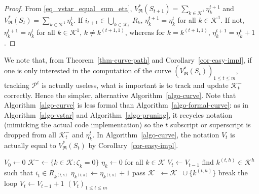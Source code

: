 \documentclass[
  11pt,
  a4paper,
]{article}
\theoremstyle{plain}
\theoremstyle{definition}
\theoremstyle{plain}
\theoremstyle{definition}
\theoremstyle{plain}
\theoremstyle{remark}
\begin{document}
\begin{proof}
From \eqref{eq_vstar_equal_sum_eta},
\(V^*_{\mathfrak{R}}(S_{t+1})=\sum_{k\in\mathcal{K}^1} \eta_k^{t+1}\)
and \(V^*_{\mathfrak{R}}(S_{t})=\sum_{k\in\mathcal{K}^1} \eta_k^{t}\).
If \(i_{t+1}\in \bigcup_{k\in\mathcal{K}^-_t}R_k\),
\(\eta_k^{t+1}=\eta_k^{t}\) for all \(k\in\mathcal{K}^1\). If not,
\(\eta_k^{t+1}=\eta_k^{t}\) for all \(k\in\mathcal{K}^1\),
\(k\neq k^{(t+1,1)}\), whereas for \(k= k^{(t+1,1)}\),
\(\eta_k^{t+1}=\eta_k^{t}+1\).
\end{proof}

We note that, from Theorem~\ref{thm-curve-path} and
Corollary~\ref{cor-easy-impl}, if one is only interested in the
computation of the curve
\(\left(V^*_{\mathfrak{R}}(S_{t})\right)_{1\leq t\leq m}\), tracking
\(\mathcal{P}^t\) is actually useless, what is important is to track and
update \(\mathcal{K}^-_t\) correctly. Hence the simpler, alternative
Algorithm~\ref{algo-curve}. Note that Algorithm~\ref{algo-curve} is less
formal than Algorithm~\ref{algo-formal-curve}: as in
Algorithm~\ref{algo-vstar} and Algorithm~\ref{algo-pruning}, it recycles
notation (mimicking the actual code implementation) so the \(t\)
subscript or superscript is dropped from all \(\mathcal{K}^-_t\) and
\(\eta_k^t\). In Algorithm~\ref{algo-curve}, the notation \(V_t\) is
actually equal to \(V^*_{\mathfrak{R}}(S_{t})\) by
Corollary~\ref{cor-easy-impl}.

\begin{algorithm}[htb!]
\caption{\label{algo-curve}Practical computation of $(V^*_{\mathfrak{R}}(S_t))_{0\leq t\leq m}$}
\begin{algorithmic}[1]
  \State $V_0\gets 0$
  \State $\mathcal{K}^-\gets\{k\in\mathcal{K} : \zeta_k=0  \}$
  \State $\eta_k\gets 0$ for all $k\in\mathcal{K}$
      \State $V_{t}\gets V_{t-1}$
    \Else
        \State find $k^{(t,h)}\in\mathcal{K}^{h}$ such that $i_t\in R_{k^{(t,h)}}$
        \State $\eta_{k^{(t,h)}}\gets\eta_{k^{(t,h)}} + 1$
          \State pass
        \Else
          \State $\mathcal{K}^- \gets \mathcal{K}^-\cup \{ k^{(t,h)} \}$
          \State break the loop
        \EndIf
      \EndFor
     \State $V_{t}\gets V_{t-1} + 1$
    \EndIf
  \EndFor
  \State\Return $(V_t)_{1\leq t \leq m}$
\EndProcedure
\end{algorithmic}
\end{algorithm}
\end{document}
